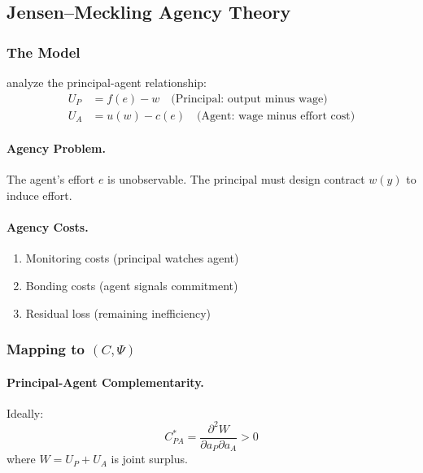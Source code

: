 \subsection{Jensen--Meckling Agency Theory}
\label{app:jensenmeckling}

\subsubsection{The Model}

\citet{jensenmeckling1976} analyze the principal-agent relationship:
\begin{align}
  U_P &= f(e) - w \quad \text{(Principal: output minus wage)} \\
  U_A &= u(w) - c(e) \quad \text{(Agent: wage minus effort cost)}
\end{align}

\paragraph{Agency Problem.}
The agent's effort $e$ is unobservable. 
The principal must design contract $w(y)$ to induce effort.

\paragraph{Agency Costs.}
\begin{enumerate}
  \item Monitoring costs (principal watches agent)
  \item Bonding costs (agent signals commitment)
  \item Residual loss (remaining inefficiency)
\end{enumerate}

\subsubsection{Mapping to $(C, \Psi)$}

\paragraph{Principal-Agent Complementarity.}
Ideally:
\begin{equation}
  C_{PA}^* = \frac{\partial^2 W}{\partial a_P \partial a_A} > 0
\end{equation}
where $W = U_P + U_A$ is joint surplus.

